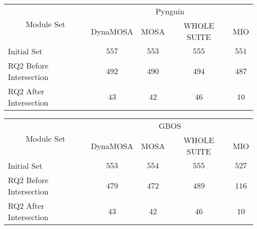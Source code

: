 
\begin{tabular}{lcccc}\toprule
    \multicolumn{1}{c}{\multirow{2}{*}{Module Set}} & \multicolumn{4}{c}{Pynguin}                \\ \cmidrule(lr){2-5}
    \multicolumn{1}{c}{}                          & DynaMOSA & MOSA    & WHOLE SUITE & MIO     \\ \midrule
    Initial Set                                     & \(557\)  & \(553\) & \(555\)     & \(551\) \\
    RQ2 Before Intersection                         & \(492\)  & \(490\) & \(494\)     & \(487\) \\
    RQ2 After Intersection                          & \(43\)  & \(42\) & \(46\)     & \(10\) \\ 
    \bottomrule
  \end{tabular}
  \centering 
  \begin{tabular}{lcccc}\toprule
    \multicolumn{1}{c}{\multirow{2}{*}{Module Set}} & \multicolumn{4}{c}{GBOS}                   \\ \cmidrule(lr){2-5}
    \multicolumn{1}{c}{}                          & DynaMOSA & MOSA    & WHOLE SUITE & MIO     \\ \midrule
    Initial Set                                     & \(553\)  & \(554\) & \(555\)     & \(527\) \\
    RQ2 Before Intersection                         & \(479\)  & \(472\) & \(489\)     & \(116\) \\
    RQ2 After Intersection                          & \(43\)  & \(42\) & \(46\)     & \(10\) \\ 
    \bottomrule
\end{tabular}
